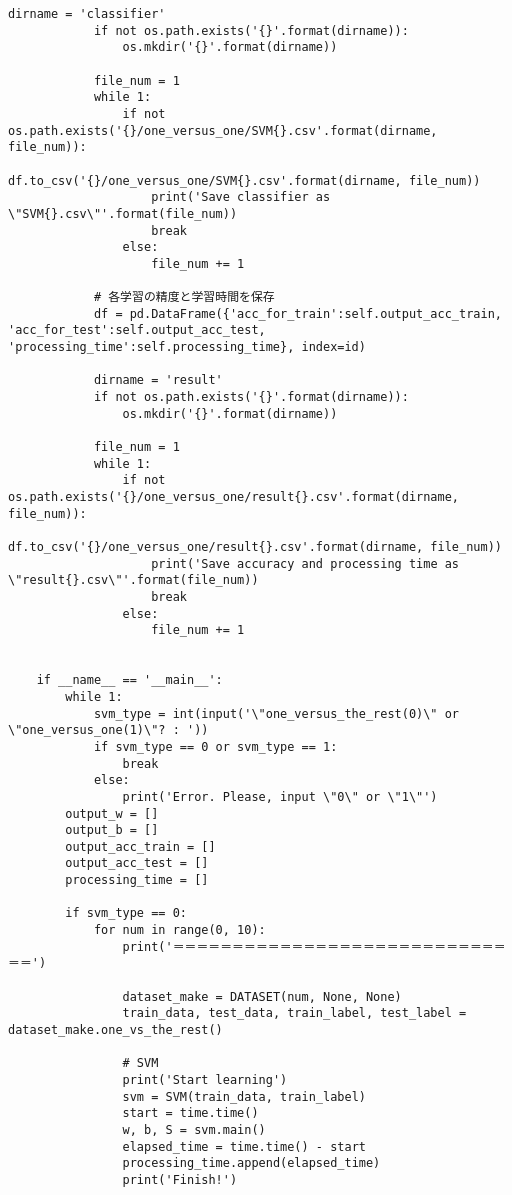\begin{lstlisting}[caption=課題2のMNISTの数字画像識別におけるSVM学習用プログラム]
            dirname = 'classifier'
            if not os.path.exists('{}'.format(dirname)):
                os.mkdir('{}'.format(dirname))

            file_num = 1
            while 1:
                if not os.path.exists('{}/one_versus_one/SVM{}.csv'.format(dirname, file_num)):
                    df.to_csv('{}/one_versus_one/SVM{}.csv'.format(dirname, file_num))
                    print('Save classifier as \"SVM{}.csv\"'.format(file_num))
                    break
                else:
                    file_num += 1

            # 各学習の精度と学習時間を保存
            df = pd.DataFrame({'acc_for_train':self.output_acc_train, 'acc_for_test':self.output_acc_test, 'processing_time':self.processing_time}, index=id)
            
            dirname = 'result'
            if not os.path.exists('{}'.format(dirname)):
                os.mkdir('{}'.format(dirname))

            file_num = 1
            while 1:
                if not os.path.exists('{}/one_versus_one/result{}.csv'.format(dirname, file_num)):
                    df.to_csv('{}/one_versus_one/result{}.csv'.format(dirname, file_num))
                    print('Save accuracy and processing time as \"result{}.csv\"'.format(file_num))
                    break
                else:
                    file_num += 1


    if __name__ == '__main__':
        while 1:
            svm_type = int(input('\"one_versus_the_rest(0)\" or \"one_versus_one(1)\"? : '))
            if svm_type == 0 or svm_type == 1:
                break
            else:
                print('Error. Please, input \"0\" or \"1\"')
        output_w = []
        output_b = []
        output_acc_train = []
        output_acc_test = []
        processing_time = []

        if svm_type == 0:
            for num in range(0, 10):
                print('＝＝＝＝＝＝＝＝＝＝＝＝＝＝＝＝＝＝＝＝＝＝＝＝＝＝＝＝＝＝')

                dataset_make = DATASET(num, None, None)
                train_data, test_data, train_label, test_label = dataset_make.one_vs_the_rest()

                # SVM
                print('Start learning')
                svm = SVM(train_data, train_label)
                start = time.time()
                w, b, S = svm.main()
                elapsed_time = time.time() - start
                processing_time.append(elapsed_time)
                print('Finish!')


\end{lstlisting}
